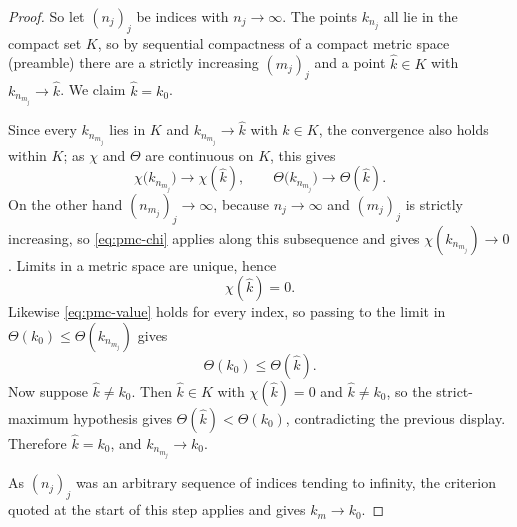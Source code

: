 \begin{proof}
So let $(n_j)_j$ be indices with $n_j\to\infty$. The points $k_{n_j}$ all lie in
the compact set $K$, so by sequential compactness of a compact metric space
(preamble) there are a strictly increasing $(m_j)_j$ and a point $\hat k\in K$
with $k_{n_{m_j}}\to\hat k$. We claim $\hat k=k_0$.

Since every $k_{n_{m_j}}$ lies in $K$ and $k_{n_{m_j}}\to\hat k$ with $\hat k\in
K$, the convergence also holds within $K$; as $\chi$ and $\Theta$ are continuous
on $K$, this gives
\[
  \chi\bigl(k_{n_{m_j}}\bigr)\longrightarrow\chi(\hat k),
  \qquad
  \Theta\bigl(k_{n_{m_j}}\bigr)\longrightarrow\Theta(\hat k).
\]
On the other hand $(n_{m_j})_j\to\infty$, because $n_j\to\infty$ and
$(m_j)_j$ is strictly increasing, so \eqref{eq:pmc-chi} applies along this
subsequence and gives $\chi(k_{n_{m_j}})\to0$. Limits in a metric space are
unique, hence
\[
  \chi(\hat k)=0 .
\]
Likewise \eqref{eq:pmc-value} holds for every index, so passing to the limit in
$\Theta(k_0)\le\Theta(k_{n_{m_j}})$ gives
\[
  \Theta(k_0)\le\Theta(\hat k).
\]
Now suppose $\hat k\ne k_0$. Then $\hat k\in K$ with $\chi(\hat k)=0$ and
$\hat k\ne k_0$, so the strict-maximum hypothesis gives
$\Theta(\hat k)<\Theta(k_0)$, contradicting the previous display. Therefore
$\hat k=k_0$, and $k_{n_{m_j}}\to k_0$.

As $(n_j)_j$ was an arbitrary sequence of indices tending to infinity, the
criterion quoted at the start of this step applies and gives $k_m\to k_0$.
\end{proof}
